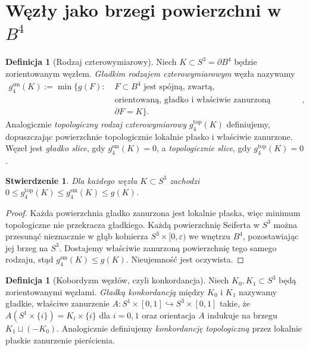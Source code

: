 \documentclass[11pt,a4paper]{report}
\numberwithin{equation}{section}
\theoremstyle{plain}
\newtheorem{stwierdzenie}[twierdzenie]{Stwierdzenie}
\theoremstyle{definition}
\newtheorem{definicja}[twierdzenie]{Definicja}
\theoremstyle{remark}
\begin{document}
\section{Węzły jako brzegi powierzchni w \texorpdfstring{$B^4$}{B4}}
\label{sec:kt-slice}

\begin{definicja}[Rodzaj czterowymiarowy]
Niech $K\subset S^3=\partial B^4$ będzie zorientowanym węzłem.
\emph{Gładkim rodzajem czterowymiarowym} węzła nazywamy
\[
\begin{aligned}
g_4^{\mathrm{sm}}(K):=\min\big\{g(F):\;&F\subset B^4
\text{ jest spójną, zwartą,}\\
&\text{orientowaną, gładko i właściwie zanurzoną powierzchnią},\\
&\partial F=K\big\}.
\end{aligned}
\]
Analogicznie \emph{topologiczny rodzaj czterowymiarowy}
$g_4^{\mathrm{top}}(K)$ definiujemy, dopuszczając powierzchnie
topologicznie lokalnie płasko i właściwie zanurzone.
Węzeł jest \emph{gładko slice}, gdy $g_4^{\mathrm{sm}}(K)=0$,
a \emph{topologicznie slice}, gdy $g_4^{\mathrm{top}}(K)=0$.
\end{definicja}

\begin{stwierdzenie}
Dla każdego węzła $K\subset S^3$ zachodzi
$0\leq g_4^{\mathrm{top}}(K)\leq g_4^{\mathrm{sm}}(K)\leq g(K)$.
\end{stwierdzenie}

\begin{proof}
Każda powierzchnia gładko zanurzona jest lokalnie płaska,
więc minimum topologiczne nie przekracza gładkiego.
Każdą powierzchnię Seiferta w $S^3$ można przesunąć
nieznacznie w głąb kołnierza $S^3\times[0,\varepsilon)$
we wnętrzu $B^4$, pozostawiając jej brzeg na $S^3$.
Dostajemy właściwie zanurzoną powierzchnię tego samego
rodzaju, stąd $g_4^{\mathrm{sm}}(K)\leq g(K)$.
Nieujemność jest oczywista.
\end{proof}

\begin{definicja}[Kobordyzm węzłów, czyli konkordancja]
Niech $K_0,K_1\subset S^3$ będą zorientowanymi węzłami.
\emph{Gładką konkordancją} między $K_0$ i $K_1$ nazywamy
gładkie, właściwe zanurzenie
$A\colon S^1\times[0,1]\hookrightarrow S^3\times[0,1]$
takie, że $A(S^1\times\{i\})=K_i\times\{i\}$ dla $i=0,1$
oraz orientacja $A$ indukuje na brzegu $K_1\sqcup(-K_0)$.
Analogicznie definiujemy \emph{konkordancję topologiczną}
przez lokalnie płaskie zanurzenie pierścienia.
\end{definicja}
\end{document}
